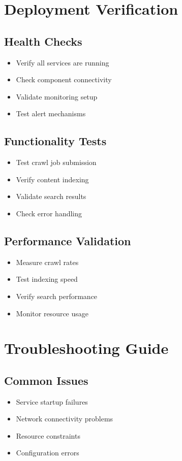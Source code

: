 \documentclass[12pt,a4paper]{report}
\begin{document}
\section{Deployment Verification}

\subsection{Health Checks}
\begin{itemize}
\item Verify all services are running
\item Check component connectivity
\item Validate monitoring setup
\item Test alert mechanisms
\end{itemize}

\subsection{Functionality Tests}
\begin{itemize}
\item Test crawl job submission
\item Verify content indexing
\item Validate search results
\item Check error handling
\end{itemize}

\subsection{Performance Validation}
\begin{itemize}
\item Measure crawl rates
\item Test indexing speed
\item Verify search performance
\item Monitor resource usage
\end{itemize}

\section{Troubleshooting Guide}

\subsection{Common Issues}
\begin{itemize}
\item Service startup failures
\item Network connectivity problems
\item Resource constraints
\item Configuration errors
\end{itemize}
\end{document}
